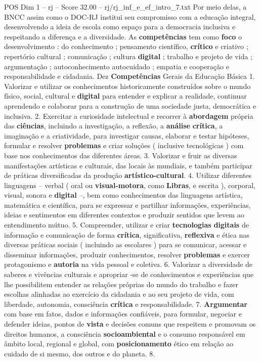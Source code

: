 \begin{textsample}{POS Dim 1 – rj – Score 32.00 – rj/rj\_inf\_e\_ef\_intro\_7.txt}
Por meio delas, a BNCC assim como o DOC-RJ institui seu compromisso com a educação integral, desenvolvendo a ideia de escola como espaço para a democracia inclusiva e respeitando a diferença e a diversidade.
As \textbf{competências} tem como \textbf{foco} o desenvolvimento : do conhecimento ; pensamento científico, \textbf{crítico} e criativo ; repertório cultural ; comunicação ; cultura \textbf{digital} ; trabalho e projeto de vida ; argumentação ; autoconhecimento autocuidado ; empatia e cooperação e responsabilidade e cidadania.
Dez \textbf{Competências} Gerais da Educação Básica 1.
Valorizar e utilizar os conhecimentos historicamente construídos sobre o mundo físico, social, cultural e \textbf{digital} para entender e explicar a realidade, continuar aprendendo e colaborar para a construção de uma sociedade justa, democrática e inclusiva. 2.
Exercitar a curiosidade intelectual e recorrer à \textbf{abordagem} própria das \textbf{ciências}, incluindo a investigação, a reflexão, a \textbf{análise} \textbf{crítica}, a imaginação e a criatividade, para investigar causas, elaborar e testar hipóteses, formular e resolver \textbf{problemas} e criar soluções ( inclusive tecnológicas ) com base nos conhecimentos das diferentes áreas. 3.
Valorizar e fruir as diversas manifestações artísticas e culturais, das locais às mundiais, e também participar de práticas diversificadas da produção \textbf{artístico-cultural}. 4.
Utilizar diferentes linguagens – verbal ( oral ou \textbf{visual-motora}, como \textbf{Libras}, e escrita ), corporal, visual, sonora e \textbf{digital} –, bem como conhecimentos das linguagens artística, matemática e científica, para se expressar e partilhar informações, experiências, ideias e sentimentos em diferentes contextos e produzir sentidos que levem ao entendimento mútuo. 5.
Compreender, utilizar e criar \textbf{tecnologias} \textbf{digitais} de informação e comunicação de forma \textbf{crítica}, significativa, \textbf{reflexiva} e ética nas diversas práticas sociais ( incluindo as escolares ) para se comunicar, acessar e disseminar informações, produzir conhecimentos, resolver \textbf{problemas} e exercer protagonismo e \textbf{autoria} na vida pessoal e coletiva. 6.
Valorizar a diversidade de saberes e vivências culturais e apropriar -se de conhecimentos e experiências que lhe possibilitem entender as relações próprias do mundo do trabalho e fazer escolhas alinhadas ao exercício da cidadania e ao seu projeto de vida, com liberdade, autonomia, consciência \textbf{crítica} e responsabilidade. 7. \textbf{Argumentar} com base em fatos, dados e informações confiáveis, para formular, negociar e defender ideias, pontos de \textbf{vista} e decisões comuns que respeitem e promovam os direitos humanos, a consciência \textbf{socioambiental} e o consumo responsável em âmbito local, regional e global, com \textbf{posicionamento} ético em relação ao cuidado de si mesmo, dos outros e do planeta. 8.

\end{textsample}
